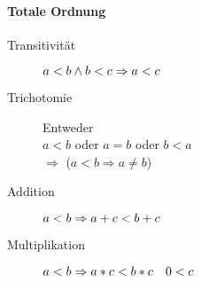\paragraph{Totale Ordnung}

\begin{description}
  \item [Transitivität]
        $\linebreak a < b \land b < c \Rightarrow a < c$

  \item [Trichotomie] Entweder \\
        $a < b$ oder $a = b$ oder $b < a$ \\
        $\Rightarrow$  ($a < b \Rightarrow a \neq b$)

  \item [Addition]
        $\linebreak a < b \Rightarrow a + c < b + c$

  \item [Multiplikation]
        $\linebreak a < b \Rightarrow a * c < b * c \quad 0 < c$
\end{description}

% 
% 
% 

